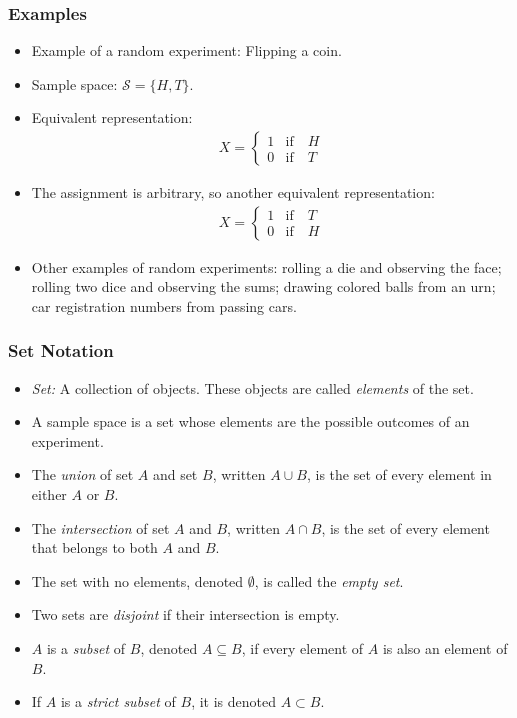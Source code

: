 \begin{frame}
\frametitle{Examples}
\begin{itemize}
\item Example of a random experiment: Flipping a coin.
\item Sample space: $\mathcal{S}=\{H,T\}$. 
\item Equivalent representation: 
\begin{align*}
X = 
\begin{cases} 
1 & \text{if} \quad H\\
0 & \text{if} \quad T
\end{cases}
\end{align*}
\item The assignment is arbitrary, so another equivalent representation:
\begin{align*}
X = 
\begin{cases} 
1 & \text{if} \quad T\\
0 & \text{if} \quad H
\end{cases}
\end{align*}
\item Other examples of random experiments: rolling a die and observing the face; rolling two dice and observing the sums; drawing colored balls from an urn; car registration numbers from passing cars. 
\end{itemize}
\end{frame}


\begin{frame}
\frametitle{Set Notation}
\begin{itemize}
\item \emph{Set:} A collection of objects. These objects are called \emph{elements} of the set. 
\item A sample space is a set whose elements are the possible outcomes of an experiment. 
\item The \emph{union} of set $A$ and set $B$, written $A \cup B$, is the set of every element in either $A$ or $B$. 
\item The \emph{intersection} of set $A$ and $B$, written $A \cap B$, is the set of every element that belongs to both $A$ and $B$.  
\item The set with no elements, denoted $\emptyset$, is called the \emph{empty set}.
\item Two sets are \emph{disjoint} if their intersection is empty.
\item $A$ is a \emph{subset} of $B$, denoted $A \subseteq B$, if every element of $A$ is also an element of $B$. 
\item If $A$ is a \emph{strict subset} of $B$, it is denoted $A \subset B$.
\end{itemize}
\end{frame}

